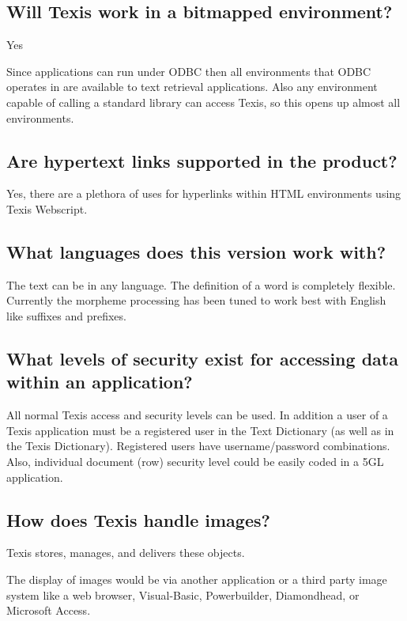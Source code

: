 \subsection{Will Texis work in a bitmapped environment?}

Yes

Since applications can run under ODBC then all environments that ODBC
operates in are available to text retrieval applications.  Also any
environment capable of calling a standard library can access Texis, so
this opens up almost all environments.

\subsection{Are hypertext links supported in the product?}

Yes, there are a plethora of uses for hyperlinks within HTML environments
using Texis Webscript.

\subsection{What languages does this version work with?}

The text can be in any language.  The definition of a word is completely
flexible.  Currently the morpheme processing has been tuned to work best
with English like suffixes and prefixes.

\subsection{What levels of security exist for accessing data within an application?}

All normal Texis access and security levels can be used.  In addition a
user of a Texis application must be a registered user in the Text
Dictionary (as well as in the Texis Dictionary).  Registered users have
username/password combinations.  Also, individual document (row) security
level could be easily coded in a 5GL application.

\subsection{How does Texis handle images?}

Texis stores, manages, and delivers these objects.

The display of images would be via another application or a
third party image system like a web browser, Visual-Basic, Powerbuilder,
Diamondhead, or
Microsoft Access.

